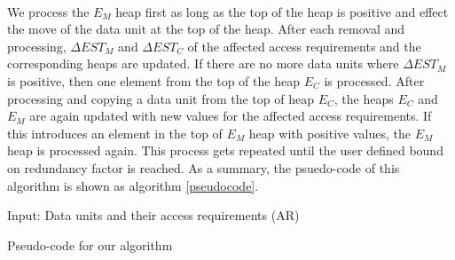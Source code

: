 \\
We process the $E_M$ heap first as long as the top of the heap is positive and effect the move of the data unit at the top of the heap. After each removal and processing, $\Delta EST_M$ and $\Delta EST_C$ of the affected access requirements and the corresponding heaps are updated. If there are no more data units where $\Delta EST_M$ is positive, then one element from the top of the heap $E_C$ is processed. After processing and copying a data unit from the top of heap $E_C$, the heaps $E_C$ and $E_M$ are again updated with new values for the affected access requirements. If this introduces an element in the top of $E_M$ heap with positive values, the $E_M$ heap is processed again. This process gets repeated until the user defined bound on redundancy factor is reached. As a summary, the psuedo-code of this algorithm is shown as algorithm \ref{pseudocode}.

\begin{algorithm}
Input: Data units and their access requirements (AR) \;
\caption{Pseudo-code for our algorithm}
\label{pseudocode}
\end{algorithm}

